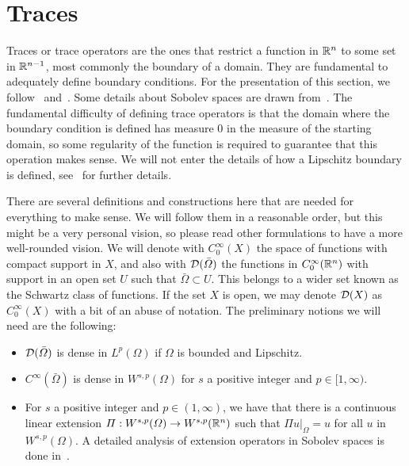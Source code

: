 
\section{Traces}\label{sec:traces}
Traces or trace operators are the ones that restrict a function in $\mathbb{R}^n$ to some set in $\mathbb{R}^{n-1}$, most commonly the boundary of a domain. They are fundamental to adequately define boundary conditions. For the presentation of this section, we follow~\cite{gatica2014simple} and~\cite{monk2003finite}. Some details about Sobolev spaces are drawn from~\cite{adams2003sobolev}. The fundamental difficulty of defining trace operators is that the domain where the boundary condition is defined has measure 0 in the measure of the starting domain, so some regularity of the function is required to guarantee that this operation makes sense. We will not enter the details of how a Lipschitz boundary is defined, see~\cite{monk2003finite} for further details.

There are several definitions and constructions here that are needed for everything to make sense. We will follow them in a reasonable order, but this might be a very personal vision, so please read other formulations to have a more well-rounded vision. We will denote with $C_0^\infty(X)$ the space of functions with compact support in $X$, and also with $\mathcal{D}(\bar\Omega)$ the functions in $C_0^\infty(\mathbb{R}^n)$ with support in an open set $U$ such that $\bar\Omega\subset U$. This belongs to a wider set known as the Schwartz class of functions. If the set $X$ is open, we may denote $\mathcal{D}(X)$ as $C_0^\infty(X)$ with a bit of an abuse of notation.
The preliminary notions we will need are the following:
\begin{itemize}
    \item $\mathcal{D}(\bar\Omega)$ is dense in $L^p(\Omega)$ if $\Omega$ is bounded and Lipschitz.
    \item $C^\infty(\bar\Omega)$ is dense in $W^{s,p}(\Omega)$ for $s$ a positive integer and $p\in [1,\infty)$.
    \item For $s$ a positive integer and $p\in (1,\infty)$, we have that there is a continuous linear extension $\Pi: W^{s,p}(\Omega) \to W^{s,p}(\mathbb{R}^n)$ such that $\Pi u|_\Omega = u$ for all $u$ in $W^{s,p}(\Omega)$. A detailed analysis of extension operators in Sobolev spaces is done in~\cite[Section 9.2]{BrezisFA}.
\end{itemize}

